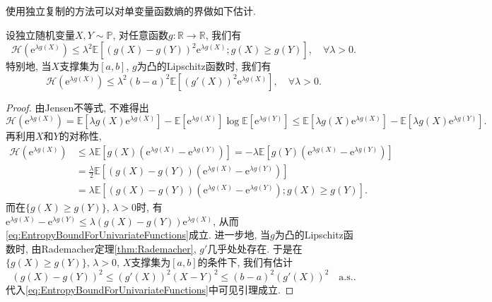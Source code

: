 使用独立复制的方法可以对单变量函数熵的界做如下估计. 
\begin{lemma}[单变量函数熵的界]\label{lemma:EntropyBoundForUnivariateFunctions}
	设独立随机变量$X, Y \sim \mathbb{P}$, 对任意函数$g \colon \mathbb{R} \to \mathbb{R}$, 我们有
	\begin{equation}\label{eq:EntropyBoundForUnivariateFunctions}
		\mathcal{H}(\mathrm{e}^{\lambda g(X)})
		\leq \lambda^2 \mathbb{E}[ (g(X) - g(Y))^2 \mathrm{e}^{\lambda g(X)}; g(X) \geq g(Y) ], \quad \forall \lambda > 0.
	\end{equation}
	特别地, 当$X$支撑集为$[a, b]$, $g$为凸的Lipschitz函数时, 我们有
	\begin{equation*}
		\mathcal{H}(\mathrm{e}^{\lambda g(X)}) 
		\leq \lambda^2 (b-a)^2 \mathbb{E}[(g'(X))^2 \mathrm{e}^{\lambda g(X)}], \quad \forall \lambda > 0.
	\end{equation*}
\end{lemma}
\begin{proof}
	由Jensen不等式, 不难得出
	\begin{equation*}
		\mathcal{H}(\mathrm{e}^{\lambda g(X)})
		= \mathbb{E}[\lambda g(X) \mathrm{e}^{\lambda g(X)}] - \mathbb{E}[\mathrm{e}^{\lambda g(X)}] \log \mathbb{E}[\mathrm{e}^{\lambda g(Y)}] 
		\leq \mathbb{E}[\lambda g(X) \mathrm{e}^{\lambda g(X)}] - \mathbb{E}[\lambda g(X) \mathrm{e}^{\lambda g(Y)}].
	\end{equation*}
	再利用$X$和$Y$的对称性, 
	\begin{align*}
		\mathcal{H}(\mathrm{e}^{\lambda g(X)})
		&\leq \lambda \mathbb{E}[ g(X) (\mathrm{e}^{\lambda g(X)}-  \mathrm{e}^{\lambda g(Y)})] 
		= - \lambda \mathbb{E}[ g(Y) (\mathrm{e}^{\lambda g(X)}-  \mathrm{e}^{\lambda g(Y)})] \\
		&= \frac{\lambda}{2} \mathbb{E}\left[(g(X) - g(Y)) (\mathrm{e}^{\lambda g(X)} - \mathrm{e}^{\lambda g(Y)})\right] \\
		&= \lambda \mathbb{E}\left[(g(X) - g(Y)) (\mathrm{e}^{\lambda g(X)} - \mathrm{e}^{\lambda g(Y)}); g(X) \geq g(Y) \right].
	\end{align*}
	而在$\{g(X) \geq g(Y)\}$, $\lambda > 0$时, 有$\mathrm{e}^{\lambda g(X)} - \mathrm{e}^{\lambda g(Y)} \leq \lambda(g(X) - g(Y)) \mathrm{e}^{\lambda g(X)}$, 从而\eqref{eq:EntropyBoundForUnivariateFunctions}成立. 
	进一步地, 当$g$为凸的Lipschitz函数时, 由Rademacher定理\ref{thm:Rademacher}, $g'$几乎处处存在. 
	于是在$\{g(X) \geq g(Y)\}$, $\lambda > 0$, $X$支撑集为$[a, b]$的条件下, 我们有估计
	\begin{equation*}
		(g(X) - g(Y))^2 \leq (g'(X))^2 (X-Y)^2 \leq (b-a)^2 (g'(X))^2 \quad \text{a.s.}.
	\end{equation*}
	代入\eqref{eq:EntropyBoundForUnivariateFunctions}中可见引理成立. 
\end{proof}

